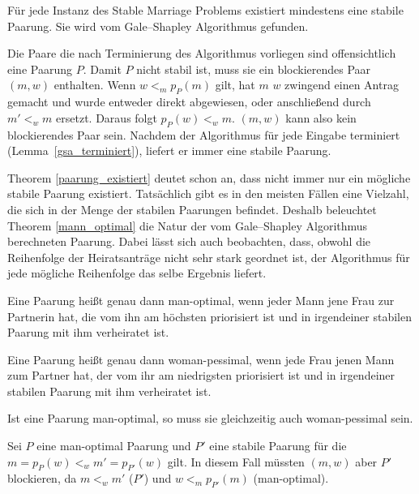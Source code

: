 \begin{Theorem}
\label{paarung_existiert}
  Für jede Instanz des Stable Marriage Problems existiert mindestens eine stabile Paarung. Sie wird vom Gale–Shapley Algorithmus gefunden.
\end{Theorem}

\begin{Beweis}
\label{paarung_existiert_bew}
  Die Paare die nach Terminierung des Algorithmus vorliegen sind offensichtlich eine Paarung $P$. Damit $P$ nicht stabil ist, muss sie ein blockierendes Paar $(m,w)$ enthalten. Wenn $w <_{m} p_{P}(m)$ gilt, hat $m$ $w$ zwingend einen Antrag gemacht und wurde entweder direkt abgewiesen, oder anschließend durch $m' <_{w} m$ ersetzt. Daraus folgt $p_{P}(w) <_{w} m$. $(m,w)$ kann also kein blockierendes Paar sein. Nachdem der Algorithmus für jede Eingabe terminiert (Lemma~\ref{gsa_terminiert}), liefert er immer eine stabile Paarung.
\end{Beweis}

Theorem \ref{paarung_existiert} deutet schon an, dass nicht immer nur ein mögliche stabile Paarung existiert. Tatsächlich gibt es in den meisten Fällen eine Vielzahl, die sich in der Menge der stabilen Paarungen befindet. Deshalb beleuchtet Theorem \ref{mann_optimal} die Natur der vom Gale–Shapley Algorithmus berechneten Paarung. Dabei lässt sich auch beobachten, dass, obwohl die Reihenfolge der Heiratsanträge nicht sehr stark geordnet ist, der Algorithmus für jede mögliche Reihenfolge das selbe Ergebnis liefert.

\begin{Definition}
\label{man_optimal}
  Eine Paarung heißt genau dann man-optimal, wenn jeder Mann jene Frau zur Partnerin hat, die vom ihn am höchsten priorisiert ist und in irgendeiner stabilen Paarung mit ihm verheiratet ist.
\end{Definition}

\begin{Definition}
\label{woman_pessimal}
  Eine Paarung heißt genau dann woman-pessimal, wenn jede Frau jenen Mann zum Partner hat, der vom ihr am niedrigsten priorisiert ist und in irgendeiner stabilen Paarung mit ihm verheiratet ist.
\end{Definition}

\begin{Lemma}
\label{man_optimal_woman_pessimal}
  Ist eine Paarung man-optimal, so muss sie gleichzeitig auch woman-pessimal sein.
\end{Lemma}

\begin{Beweis}
\label{man_optimal_woman_pessimal_bew}
  Sei $P$ eine man-optimal Paarung und $P'$ eine stabile Paarung für die $m = p_{P}(w) <_{w} m' = p_{P'}(w)$ gilt. In diesem Fall müssten $(m,w)$ aber $P'$ blockieren, da $m <_{w} m'$ ($P'$) und $w <_{m} p_{P'}(m)$ (man-optimal).
\end{Beweis}

